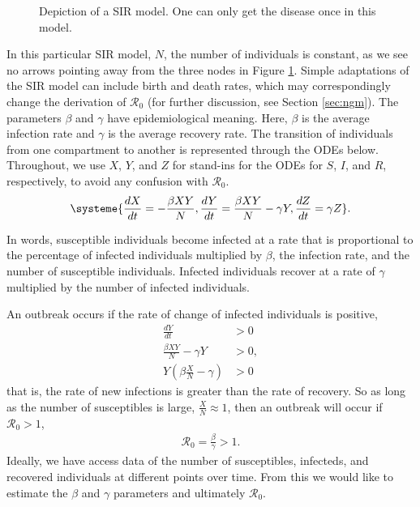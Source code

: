 \documentclass[12pt]{article}
\newcommand{\rr}{\ensuremath{\mathcal{R}_0}}
\begin{document}
\begin{figure}[h]
\centering
{}
\caption{Depiction of a SIR model.  One can only get the disease once in this model.}\label{fig::sir}
\end{figure}
In this particular  SIR model, $N$, the number of individuals is constant, as we see no arrows pointing away from the three nodes in Figure \ref{fig::sir}. Simple adaptations of the SIR model can include birth and death rates, which may correspondingly change the derivation of $\rr$ (for further discussion, see Section \ref{sec:ngm}). The parameters  $\beta$ and $\gamma$ have epidemiological meaning.  Here, $\beta$ is the average infection rate and $\gamma$ is the average recovery rate.  The transition of individuals from one compartment to another is represented through the ODEs below.  Throughout, we use $X$, $Y$, and $Z$ for stand-ins for the ODEs for $S$, $I$, and $R$, respectively, to avoid any confusion with $\rr$.
\begin{align}
\systeme{\frac{dX}{dt} = -\frac{\beta XY}{N}, \frac{dY}{dt} = \frac{\beta XY}{N} - \gamma Y, \frac{dZ}{dt} = \gamma Z}. \label{eq::sir}
\end{align}

In words, susceptible individuals become infected at a rate that is proportional to the percentage of infected individuals multiplied by $\beta$, the infection rate, and the number of susceptible individuals.  Infected individuals recover at a rate of $\gamma$ multiplied by the number of infected individuals.

An outbreak occurs if the rate of change of infected individuals is positive,
\begin{align*}
  \frac{dY}{dt} &> 0 \\
  \frac{\beta X Y}{N}  - \gamma Y &> 0 ,\\
  Y \left ( \beta \frac{X}{N} - \gamma \right ) & > 0
\end{align*}
that is,  the rate of new infections is greater than the rate of recovery.  So as long as the number of susceptibles is large, $\frac{X}{N} \approx 1$, then an outbreak will occur if $\rr >1$,
\begin{align}\label{eq:deriv_sir}
  \rr = \frac{\beta}{\gamma} > 1.
  \end{align}
Ideally, we have access data of the number of susceptibles, infecteds, and recovered individuals at different points over time.  From this we would like to estimate the $\beta$ and $\gamma$ parameters and ultimately $\rr$.
\end{document}
